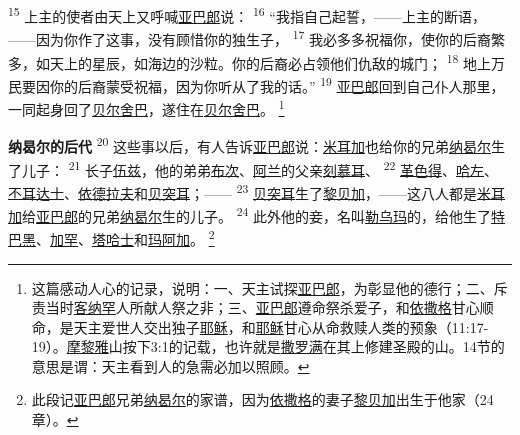 \textsuperscript{15}
上主的使者由天上又呼喊\uline{亚巴郎}说：
\textsuperscript{16}
“我指自己起誓，——上主的断语，——因为你作了这事，没有顾惜你的独生子，
\textsuperscript{17}
我必多多祝福你，使你的后裔繁多，如天上的星辰，如海边的沙粒。你的后裔必占领他们仇敌的城门；
\textsuperscript{18}
地上万民要因你的后裔蒙受祝福，因为你听从了我的话。”
\textsuperscript{19}
\uline{亚巴郎}回到自己仆人那里，一同起身回了\uline{贝尔}\uline{舍巴}，遂住在\uline{贝尔}\uline{舍巴}。
\footnote{这篇感动人心的记录，说明：一、天主试探\uline{亚巴郎}，为彰显他的德行；二、斥责当时\uline{客纳罕}人所献人祭之非；三、\uline{亚巴郎}遵命祭杀爱子，和\uline{依撒格}甘心顺命，是天主爱世人交出独子\uline{耶稣}，和\uline{耶稣}甘心从命救赎人类的预象（11:17-19）。\uline{摩黎雅}山按下3:1的记载，也许就是\uline{撒罗满}在其上修建圣殿的山。14节的意思是谓：天主看到人的急需必加以照顾。}

\textbf{纳曷尔的后代 }
\textsuperscript{20}
这些事以后，有人告诉\uline{亚巴郎}说：\uline{米耳加}也给你的兄弟\uline{纳曷尔}生了儿子：
\textsuperscript{21}
长子\uline{伍兹}，他的弟弟\uline{布次}、\uline{阿兰}的父亲\uline{刻慕耳}、
\textsuperscript{22}
\uline{革色得}、\uline{哈左}、\uline{丕耳达士}、\uline{依德拉夫}和\uline{贝突耳}；——
\textsuperscript{23}
\uline{贝突耳}生了\uline{黎贝加}，——这八人都是\uline{米耳加}给\uline{亚巴郎}的兄弟\uline{纳曷尔}生的儿子。
\textsuperscript{24}
此外他的妾，名叫\uline{勒乌玛}的，给他生了\uline{特巴黑}、\uline{加罕}、\uline{塔哈士}和\uline{玛阿加}。
\footnote{此段记\uline{亚巴郎}兄弟\uline{纳曷尔}的家谱，因为\uline{依撒格}的妻子\uline{黎贝加}出生于他家（24章）。}


